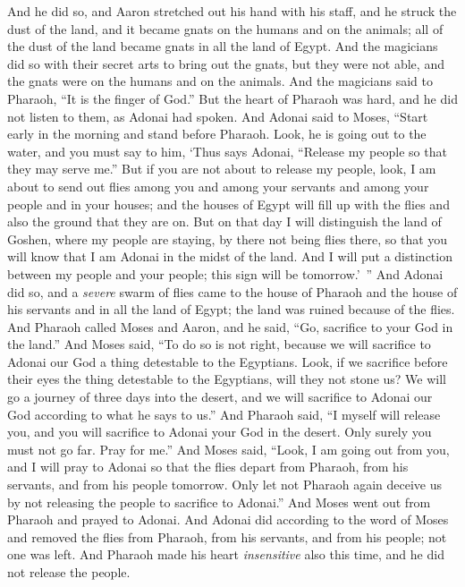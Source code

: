 \begin{biblechapter}
\verse And he did so, and Aaron stretched out his hand with his staff, and he struck the dust of the land, and it became gnats on the humans and on the animals; all of the dust of the land became gnats in all the land of Egypt.
\verse And the magicians did so with their secret arts to bring out the gnats, but they were not able, and the gnats were on the humans and on the animals.
\verse And the magicians said to Pharaoh, “It is the finger of God.” But the heart of Pharaoh was hard, and he did not listen to them, as Adonai had spoken.
 And Adonai said to Moses, “Start early in the morning and stand before Pharaoh. Look, he is going out to the water, and you must say to him, ‘Thus says Adonai, “Release my people so that they may serve me.”
\verse But if you are not about to release my people, look, I am about to send out flies among you and among your servants and among your people and in your houses; and the houses of Egypt will fill up with the flies and also the ground that they are on.
\verse But on that day I will distinguish the land of Goshen, where my people are staying, by there not being flies there, so that you will know that I am Adonai in the midst of the land.
\verse And I will put a distinction between my people and your people; this sign will be tomorrow.’ ”
\verse And Adonai did so, and a \textit{severe} swarm of flies came to the house of Pharaoh and the house of his servants and in all the land of Egypt; the land was ruined because of the flies.
\verse And Pharaoh called Moses and Aaron, and he said, “Go, sacrifice to your God in the land.”
\verse And Moses said, “To do so is not right, because we will sacrifice to Adonai our God a thing detestable to the Egyptians. Look, if we sacrifice before their eyes the thing detestable to the Egyptians, will they not stone us?
\verse We will go a journey of three days into the desert, and we will sacrifice to Adonai our God according to what he says to us.”
\verse And Pharaoh said, “I myself will release you, and you will sacrifice to Adonai your God in the desert. Only surely you must not go far. Pray for me.”
\verse And Moses said, “Look, I am going out from you, and I will pray to Adonai so that the flies depart from Pharaoh, from his servants, and from his people tomorrow. Only let not Pharaoh again deceive us by not releasing the people to sacrifice to Adonai.”
\verse And Moses went out from Pharaoh and prayed to Adonai.
\verse And Adonai did according to the word of Moses and removed the flies from Pharaoh, from his servants, and from his people; not one was left.
\verse And Pharaoh made his heart \textit{insensitive} also this time, and he did not release the people.
\end{biblechapter}

